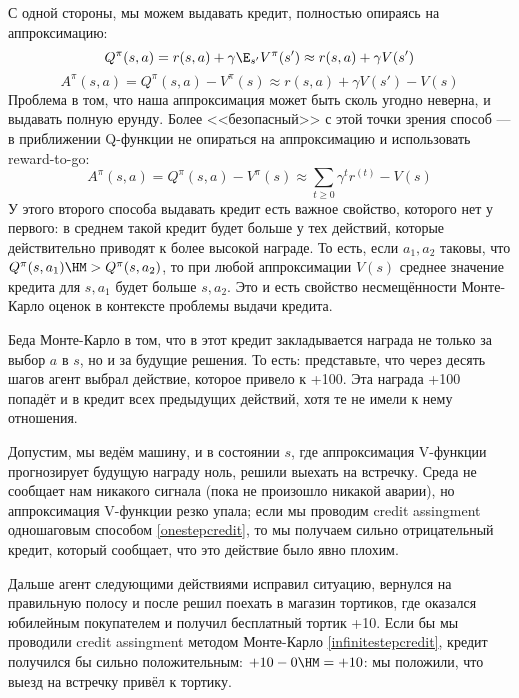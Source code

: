 С одной стороны, мы можем выдавать кредит, полностью опираясь на аппроксимацию:
$$Q^\pi(s, a) = r(s, a) + \gamma \E_{s'} V^\pi(s') \approx r(s, a) + \gamma V(s')$$
\begin{equation}\label{onestepcredit}
A^\pi(s, a) = Q^\pi(s, a) - V^\pi(s) \approx r(s, a) + \gamma V(s') - V(s)
\end{equation}
Проблема в том, что наша аппроксимация может быть сколь угодно неверна, и выдавать полную ерунду. Более <<безопасный>> с этой точки зрения способ --- в приближении Q-функции не опираться на аппроксимацию и использовать reward-to-go:
\begin{equation}\label{infinitestepcredit}
A^\pi(s, a) = Q^\pi(s, a) - V^\pi(s) \approx \sum_{t \ge 0} \gamma^t r^{(t)} - V(s)
\end{equation}
У этого второго способа выдавать кредит есть важное свойство, которого нет у первого: в среднем такой кредит будет больше у тех действий, которые действительно приводят к более высокой награде. То есть, если $a_1, a_2$ таковы, что $Q^\pi(s, a_1) \HM> Q^\pi(s, a_2)$, то при любой аппроксимации $V(s)$ среднее значение кредита для $s, a_1$ будет больше $s, a_2$. Это и есть свойство несмещённости Монте-Карло оценок в контексте проблемы выдачи кредита.

Беда Монте-Карло в том, что в этот кредит закладывается награда не только за выбор $a$ в $s$, но и за будущие решения. То есть: представьте, что через десять шагов агент выбрал действие, которое привело к +100. Эта награда +100 попадёт и в кредит всех предыдущих действий, хотя те не имели к нему отношения.

\begin{example}
Допустим, мы ведём машину, и в состоянии $s$, где аппроксимация V-функции прогнозирует будущую награду ноль, решили выехать на встречку. Среда не сообщает нам никакого сигнала (пока не произошло никакой аварии), но аппроксимация V-функции резко упала; если мы проводим credit assingment одношаговым способом \eqref{onestepcredit}, то мы получаем сильно отрицательный кредит, который сообщает, что это действие было явно плохим.

Дальше агент следующими действиями исправил ситуацию, вернулся на правильную полосу и после решил поехать в магазин тортиков, где оказался юбилейным покупателем и получил бесплатный тортик +10. Если бы мы проводили credit assingment методом Монте-Карло \eqref{infinitestepcredit}, кредит получился бы сильно положительным: $+10 - 0 \HM= +10$: мы положили, что выезд на встречку привёл к тортику.
\end{example}

